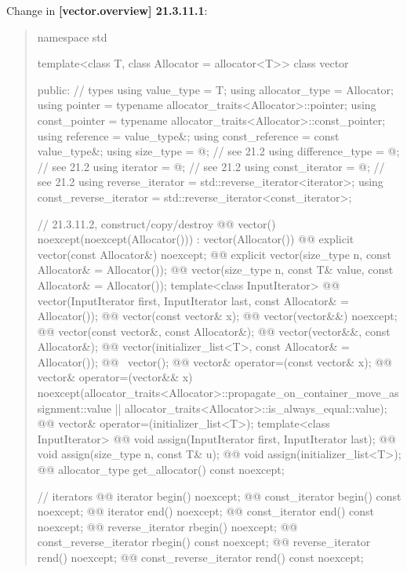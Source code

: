 \documentclass{wg21}
\begin{document}
Change in \textbf{[vector.overview] 21.3.11.1}:
\begin{quote}
\begin{codeblock}
namespace std {
  template<class T, class Allocator = allocator<T>>
  class vector {
  public:
    // types
    using value_type             = T;
    using allocator_type         = Allocator;
    using pointer                = typename allocator_traits<Allocator>::pointer;
    using const_pointer          = typename allocator_traits<Allocator>::const_pointer;
    using reference              = value_type&;
    using const_reference        = const value_type&;
    using size_type              = @\impdef@; // see 21.2
    using difference_type        = @\impdef@; // see 21.2
    using iterator               = @\impdef@; // see 21.2
    using const_iterator         = @\impdef@; // see 21.2
    using reverse_iterator       = std::reverse_iterator<iterator>;
    using const_reverse_iterator = std::reverse_iterator<const_iterator>;

    // 21.3.11.2, construct/copy/destroy
    @@ vector() noexcept(noexcept(Allocator())) : vector(Allocator()) { }
    @@ explicit vector(const Allocator&) noexcept;
    @@ explicit vector(size_type n, const Allocator& = Allocator());
    @@ vector(size_type n, const T& value, const Allocator& = Allocator());
    template<class InputIterator>
      @@ vector(InputIterator first, InputIterator last, const Allocator& = Allocator());
    @@ vector(const vector& x);
    @@ vector(vector&&) noexcept;
    @@ vector(const vector&, const Allocator&);
    @@ vector(vector&&, const Allocator&);
    @@ vector(initializer_list<T>, const Allocator& = Allocator());
    @@ ~vector();
    @@ vector& operator=(const vector& x);
    @@ vector& operator=(vector&& x)
      noexcept(allocator_traits<Allocator>::propagate_on_container_move_assignment::value ||
               allocator_traits<Allocator>::is_always_equal::value);
    @@ vector& operator=(initializer_list<T>);
    template<class InputIterator>
      @@ void assign(InputIterator first, InputIterator last);
    @@ void assign(size_type n, const T& u);
    @@ void assign(initializer_list<T>);
    @@ allocator_type get_allocator() const noexcept;

    // iterators
    @@ iterator               begin() noexcept;
    @@ const_iterator         begin() const noexcept;
    @@ iterator               end() noexcept;
    @@ const_iterator         end() const noexcept;
    @@ reverse_iterator       rbegin() noexcept;
    @@ const_reverse_iterator rbegin() const noexcept;
    @@ reverse_iterator       rend() noexcept;
    @@ const_reverse_iterator rend() const noexcept;

}}
\end{codeblock}
\end{quote}
\end{document}
